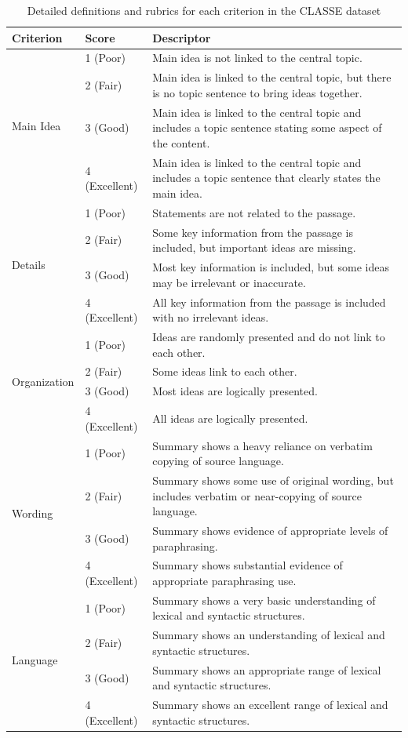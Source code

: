 \documentclass[11pt]{article}
\begin{document}
\begin{table}[h]
\centering
\renewcommand{\arraystretch}{1.4}
\begin{tabular}{|p{3.5cm}|p{2cm}|p{8.5cm}|}
\hline
\textbf{Criterion} & \textbf{Score} & \textbf{Descriptor} \\
\hline
\multirow{4}{=}{Main Idea}
& 1 (Poor) & Main idea is not linked to the central topic. \\
& 2 (Fair) & Main idea is linked to the central topic, but there is no topic sentence to bring ideas together. \\
& 3 (Good) & Main idea is linked to the central topic and includes a topic sentence stating some aspect of the content. \\
& 4 (Excellent) & Main idea is linked to the central topic and includes a topic sentence that clearly states the main idea. \\
\hline
\multirow{4}{=}{Details}
& 1 (Poor) & Statements are not related to the passage. \\
& 2 (Fair) & Some key information from the passage is included, but important ideas are missing. \\
& 3 (Good) & Most key information is included, but some ideas may be irrelevant or inaccurate. \\
& 4 (Excellent) & All key information from the passage is included with no irrelevant ideas. \\
\hline
\multirow{4}{=}{Organization}
& 1 (Poor) & Ideas are randomly presented and do not link to each other. \\
& 2 (Fair) & Some ideas link to each other. \\
& 3 (Good) & Most ideas are logically presented. \\
& 4 (Excellent) & All ideas are logically presented. \\
\hline
\multirow{4}{=}{Wording}
& 1 (Poor) & Summary shows a heavy reliance on verbatim copying of source language. \\
& 2 (Fair) & Summary shows some use of original wording, but includes verbatim or near-copying of source language. \\
& 3 (Good) & Summary shows evidence of appropriate levels of paraphrasing. \\
& 4 (Excellent) & Summary shows substantial evidence of appropriate paraphrasing use. \\
\hline
\multirow{4}{=}{Language}
& 1 (Poor) & Summary shows a very basic understanding of lexical and syntactic structures. \\
& 2 (Fair) & Summary shows an understanding of lexical and syntactic structures. \\
& 3 (Good) & Summary shows an appropriate range of lexical and syntactic structures. \\
& 4 (Excellent) & Summary shows an excellent range of lexical and syntactic structures. \\
\hline
\end{tabular}
\caption{Detailed definitions and rubrics for each criterion in the CLASSE dataset}
\label{apx:rubric}
\end{table}
\end{document}
